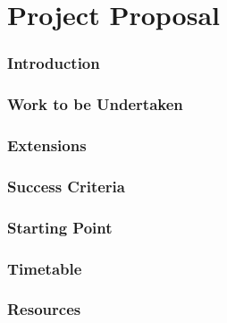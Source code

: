 \documentclass[10pt,a4paper]{article}
\begin{document}
\part*{Project Proposal}
\section*{Introduction}

\section*{Work to be Undertaken}

\section*{Extensions}

\section*{Success Criteria}

\section*{Starting Point}

\section*{Timetable}

\section*{Resources}
\end{document}
